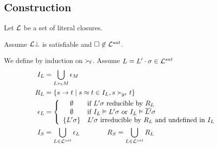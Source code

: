 \documentclass[%
]{beamer}
\begin{document}
\subsection{Construction}
\begin{frame}
    Let $\mathcal{L}$ be a set of literal closures.
    
    Assume $\mathcal{L}\bot$ is satisfiable and
    $\square\not\in\mathcal{L}^{sat}$.

    We define by induction on $\mathrel\succ_{\!\ell}$.
    Assume $L = L'\cdot\sigma \in\mathcal{L}^{sat}$
    \begin{align*}
        I_L &= \bigcup_{L\mathrel\succ_{\!\ell} M}\epsilon_M
        \\
        R_L &= \{ s \to t \mid s\approx t\in I_L, s\mathrel\succ_{\!gr} t \}
        \\
        \epsilon_L &= \left\{
            \begin{array}{cl}
                \emptyset &\text{if }
                L'\sigma\text{ reducible by }R_L
                \\
                \emptyset &\text{if }
                I_L\vDash L'\sigma
                \text{ or }
                I_L\vDash \overline{L'}\sigma
                \\
                \{ L'\sigma \}
                &L'\sigma\text{ irreducible by }R_L\text{ and undefined in }I_L
            \end{array}
        \right.\\
        I_S &= \bigcup_{L\in\mathcal{L}^{sat}} \epsilon_L
        \qquad\qquad
        R_S = \bigcup_{L\in\mathcal{L}^{sat}} R_L
    \end{align*}
\end{frame}





        
\end{document}
